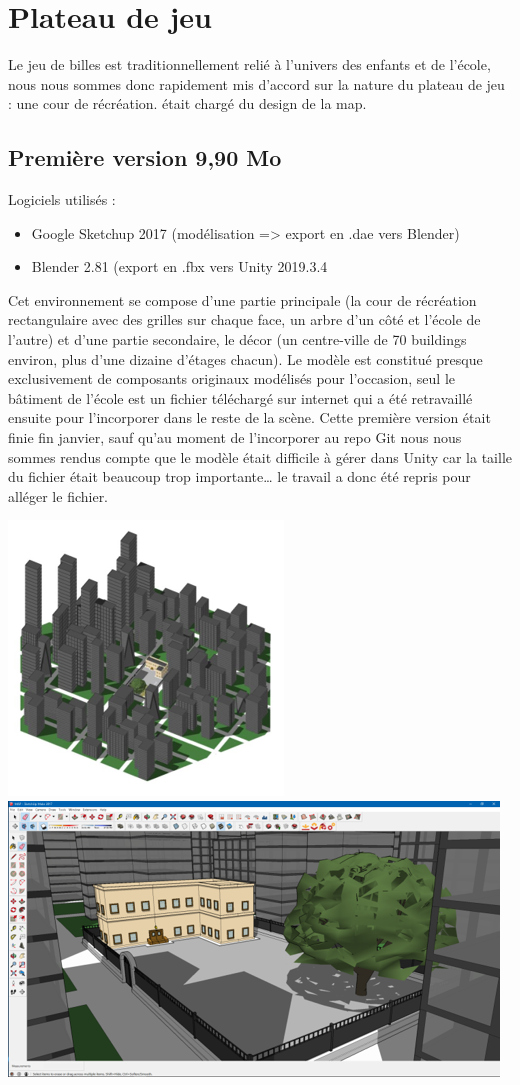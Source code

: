 \documentclass{article}
\begin{document}
\section{Plateau de jeu}
Le jeu de billes est traditionnellement relié à l’univers des enfants et de l’école, nous nous sommes donc rapidement mis d’accord sur la nature du plateau de jeu : une cour de récréation.  était chargé du design de la map.

\subsection{Première version 9,90 Mo}
Logiciels utilisés :
\begin{itemize}
    \item Google Sketchup 2017 (modélisation => export en .dae vers Blender)
    \item Blender 2.81 (export en .fbx vers Unity 2019.3.4
\end{itemize}

Cet environnement se compose d’une partie principale (la cour de récréation rectangulaire avec des grilles sur chaque face, un arbre d’un côté et l’école de l’autre) et d’une partie 	secondaire, le décor (un centre-ville de 70 buildings environ, plus d’une dizaine d’étages 	chacun). Le modèle est constitué presque exclusivement de composants originaux modélisés pour l’occasion, seul le bâtiment de l’école est un fichier téléchargé sur internet qui a été retravaillé ensuite pour l’incorporer dans le reste de la scène. Cette première version était finie fin janvier, sauf qu’au moment de l’incorporer au repo Git nous nous sommes rendus compte que le modèle était difficile à gérer dans Unity car la taille du fichier était beaucoup trop importante… le travail a donc été repris pour alléger le fichier.

\includegraphics[width=0.3\linewidth]{report/building1.png}\\
\includegraphics[width=0.6\linewidth]{report/map1.png}\\
\end{document}
